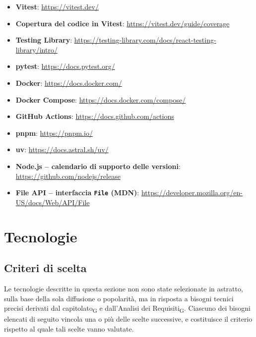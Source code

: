 \documentclass[a4paper, 10pt]{article}
\begin{document}
\begin{itemize}
    \item \textbf{Vitest}: \url{https://vitest.dev/}
    \item \textbf{Copertura del codice in Vitest}: \url{https://vitest.dev/guide/coverage}
    \item \textbf{Testing Library}: \url{https://testing-library.com/docs/react-testing-library/intro/}
    \item \textbf{pytest}: \url{https://docs.pytest.org/}
    \item \textbf{Docker}: \url{https://docs.docker.com/}
    \item \textbf{Docker Compose}: \url{https://docs.docker.com/compose/}
    \item \textbf{GitHub Actions}: \url{https://docs.github.com/actions}
    \item \textbf{pnpm}: \url{https://pnpm.io/}
    \item \textbf{uv}: \url{https://docs.astral.sh/uv/}
    \item \textbf{Node.js -- calendario di supporto delle versioni}: \url{https://github.com/nodejs/release}
    \item \textbf{File API -- interfaccia \texttt{File} (MDN)}: \url{https://developer.mozilla.org/en-US/docs/Web/API/File}
\end{itemize}

\newpage


\section{Tecnologie}
\label{sec:tecnologie}

\subsection{Criteri di scelta}
\label{sec:criteri-scelta}
Le tecnologie descritte in questa sezione non sono state selezionate in astratto, sulla base della sola diffusione o popolarità, ma in risposta a bisogni tecnici precisi derivati dal capitolato\textsubscript{G} e dall'Analisi dei Requisiti\textsubscript{G}. Ciascuno dei bisogni elencati di seguito vincola una o più delle scelte successive, e costituisce il criterio rispetto al quale tali scelte vanno valutate.
\end{document}
